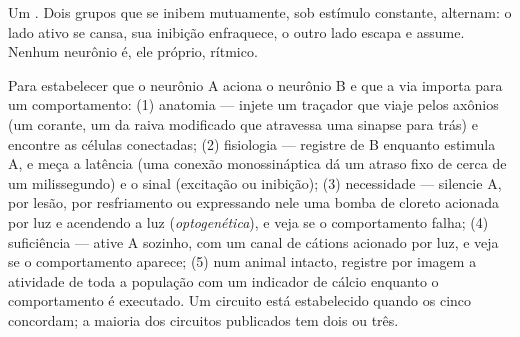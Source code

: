 \begin{omfigure}

{\small Um . Dois grupos que se inibem
mutuamente, sob estímulo constante, alternam: o lado ativo se cansa, sua
inibição enfraquece, o outro lado escapa e assume. Nenhum neurônio é,
ele próprio, rítmico.}
\end{omfigure}

\begin{method}\label{met:b3:nervous-systems:tracing}
Para estabelecer que o neurônio A aciona o neurônio B e que a via
importa para um comportamento: (1) anatomia --- injete um traçador que
viaje pelos axônios (um corante, um  da raiva modificado que
atravessa uma sinapse para trás) e encontre as células conectadas; (2)
fisiologia --- registre de B enquanto estimula A, e meça a latência (uma
conexão monossináptica dá um atraso fixo de cerca de um milissegundo) e
o sinal (excitação ou inibição); (3) necessidade --- silencie A, por
lesão, por resfriamento ou expressando nele uma bomba de cloreto
acionada por luz e acendendo a luz (\emph{optogenética}), e veja se o
comportamento falha; (4) suficiência --- ative A sozinho, com um canal
de cátions acionado por luz, e veja se o comportamento aparece; (5) num
animal intacto, registre por imagem a atividade de toda a população com
um indicador de cálcio enquanto o comportamento é executado. Um circuito
está estabelecido quando os cinco concordam; a maioria dos circuitos
publicados tem dois ou três.
\end{method}

